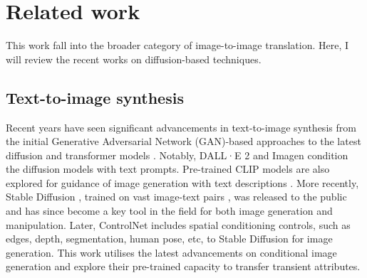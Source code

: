 \section{Related work}\label{zero-shot-RW}
This work fall into the broader category of image-to-image translation. Here, I will review the recent works on diffusion-based techniques.

\subsection{Text-to-image synthesis}

Recent years have seen significant advancements in text-to-image synthesis from the initial Generative Adversarial Network (GAN)-based approaches \cite{li2020manigan,xu2018attngan, zhang2017stackgan, zhang2018stackgan++} to the latest diffusion \cite{gu2022vector, ho2020denoising,nichol2021improved,ramesh2022hierarchical, rombach2022high, saharia2022photorealistic,song2020denoising,zhang2023adding} and transformer models \cite{ding2022cogview2, esser2021taming, ramesh2021zero, yu2022scaling}. Notably, DALL·E 2 \cite{ramesh2022hierarchical} and Imagen \cite{ho2022imagen} condition the diffusion models with text prompts.  Pre-trained CLIP models \cite{radford2021learning} are also explored for guidance of image generation with text descriptions \cite{crowson2022vqgan, ramesh2022hierarchical}. More recently, Stable Diffusion \cite{rombach2022high}, trained on vast image-text pairs \cite{schuhmann2021laion}, was released to the public and has since become a key tool in the field for both image generation and manipulation. Later, ControlNet \cite{zhang2023adding} includes spatial conditioning controls, such as edges, depth, segmentation, human pose, etc, to Stable Diffusion for image generation. This work utilises the latest advancements on conditional image generation and explore their pre-trained capacity to transfer transient attributes.

